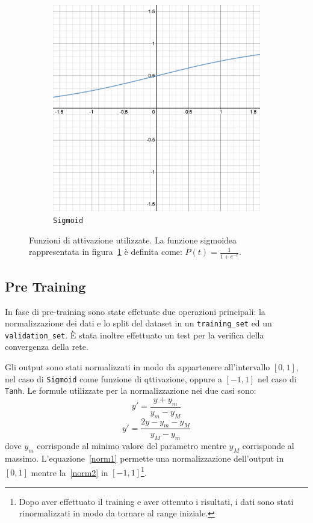 \documentclass[12pt,a4paper,final]{book}
\begin{document}
\begin{figure}[!ht]
\begin{subfigure}{0.45\textwidth}
	    \includegraphics[width=\linewidth]{../figures/sigmoid.png}
		\caption{\texttt{Sigmoid}}
		\label{sigmoid}
	\end{subfigure}
\caption{Funzioni di attivazione utilizzate. La funzione sigmoidea rappresentata in figura~\ref{sigmoid} è definita come: $P(t)=\frac{1}{1+e^{-t}}$.}
\label{act_fun}
\end{figure}



\subsection{Pre Training}\label{pre_training}
In fase di pre-training sono state effetuate due operazioni principali: la normalizzazione dei dati e lo split del dataset in un \texttt{training\_set} ed un \texttt{validation\_set}. \`E stata inoltre effettuato un test per la verifica della convergenza della rete.


Gli output sono stati normalizzati in modo da appartenere all'intervallo $[0, 1]$, nel caso di \texttt{Sigmoid} come funzione di qttivazione, oppure a $[-1, 1]$ nel caso di \texttt{Tanh}. Le formule utilizzate per la normalizzazione nei due casi sono:
\begin{equation}\label{norm1}
y'=\frac{y+y_m}{y_m-y_M}
\end{equation}
\begin{equation}\label{norm2}
y'=\frac{2y-y_m-y_M}{y_M-y_m}
\end{equation}
dove $y_m$ corrisponde al minimo valore del parametro mentre $y_M$ corrisponde al massimo.
L'equazione~\ref{norm1} permette una normalizzazione dell'output in $[0, 1]$ mentre la~\ref{norm2} in $[-1, 1]$\footnote{Dopo aver effettuato il training e aver ottenuto i risultati, i dati sono stati rinormalizzati in modo da tornare al range iniziale.}.
\end{document}
